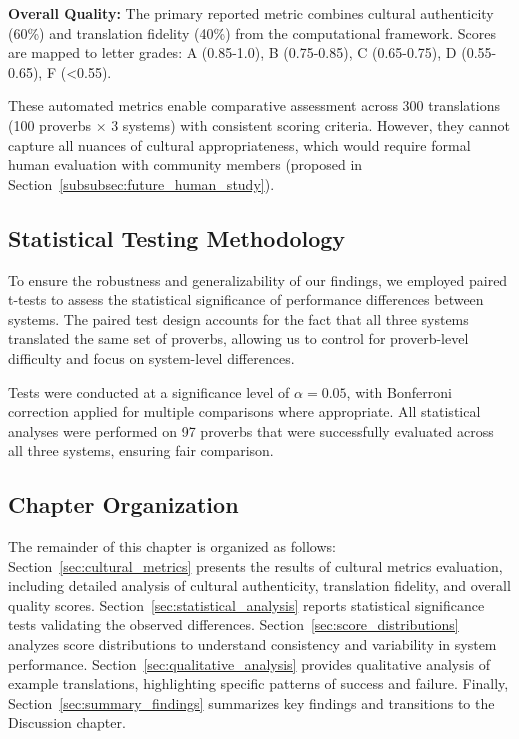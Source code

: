 \textbf{Overall Quality:} The primary reported metric combines cultural authenticity (60\%) and translation fidelity (40\%) from the computational framework. Scores are mapped to letter grades: A (0.85-1.0), B (0.75-0.85), C (0.65-0.75), D (0.55-0.65), F (<0.55).

These automated metrics enable comparative assessment across 300 translations (100 proverbs × 3 systems) with consistent scoring criteria. However, they cannot capture all nuances of cultural appropriateness, which would require formal human evaluation with community members (proposed in Section~\ref{subsubsec:future_human_study}).

\subsection{Statistical Testing Methodology}

To ensure the robustness and generalizability of our findings, we employed paired t-tests to assess the statistical significance of performance differences between systems. The paired test design accounts for the fact that all three systems translated the same set of proverbs, allowing us to control for proverb-level difficulty and focus on system-level differences.

Tests were conducted at a significance level of $\alpha = 0.05$, with Bonferroni correction applied for multiple comparisons where appropriate. All statistical analyses were performed on 97 proverbs that were successfully evaluated across all three systems, ensuring fair comparison.

\subsection{Chapter Organization}

The remainder of this chapter is organized as follows: Section~\ref{sec:cultural_metrics} presents the results of cultural metrics evaluation, including detailed analysis of cultural authenticity, translation fidelity, and overall quality scores. Section~\ref{sec:statistical_analysis} reports statistical significance tests validating the observed differences. Section~\ref{sec:score_distributions} analyzes score distributions to understand consistency and variability in system performance. Section~\ref{sec:qualitative_analysis} provides qualitative analysis of example translations, highlighting specific patterns of success and failure. Finally, Section~\ref{sec:summary_findings} summarizes key findings and transitions to the Discussion chapter.

